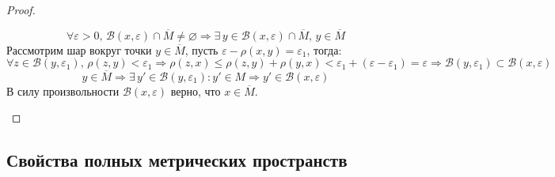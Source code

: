 \documentclass[12pt]{article}
\newcommand{\MB}{\mathcal{B}}
\newcommand{\VN}{\varnothing}
\newcommand{\VE}{\varepsilon}
\theoremstyle{definition}
\newcommand{\ovl}[1]{\overline{#1}}
\begin{document}
\begin{proof}
\begin{enumerate}[label=\arabic*)]
		$$
			\forall \VE > 0, \, \MB(x,\VE) \cap \ovl{M} \neq \VN \Rightarrow \exists \, y \in \MB(x,\VE) \cap \ovl{M}, \, y \in \ovl{M} 
		$$
		Рассмотрим шар вокруг точки $y \in \ovl{M}$, пусть $\VE - \rho(x,y) = \VE_1$, тогда:
		$$
			 \forall z \in \MB(y,\VE_1), \, \rho(z,y) < \VE_1 \Rightarrow \rho(z,x) \leq \rho(z,y) + \rho(y,x) < \VE_1 + (\VE - \VE_1) = \VE \Rightarrow \MB(y,\VE_1) \subset \MB(x,\VE)
		$$
		$$
			y \in \ovl{M} \Rightarrow \exists \, y' \in \MB(y,\VE_1) \colon y' \in M \Rightarrow y' \in \MB(x,\VE)
		$$ 
		В силу произвольности $\MB(x,\VE)$ верно, что $x \in \ovl{M}$.
	\end{enumerate}
\end{proof}

\subsection*{Свойства полных метрических пространств}
\end{document}
